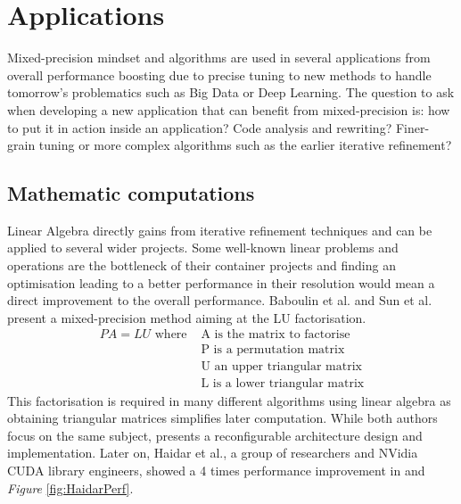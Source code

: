 \section{Applications}

Mixed-precision mindset and algorithms are used in several applications from overall performance boosting due to precise tuning to new methods to handle tomorrow's problematics such as Big Data or Deep Learning. The question to ask when developing a new application that can benefit from mixed-precision is: how to put it in action inside an application? Code analysis and rewriting? Finer-grain tuning or more complex algorithms such as the earlier iterative refinement?


\subsection{Mathematic computations}

Linear Algebra directly gains from iterative refinement techniques and can be applied to several wider projects. Some well-known linear problems and operations are the bottleneck of their container projects and finding an optimisation leading to a better performance in their resolution would mean a direct improvement to the overall performance. Baboulin et al. \cite{Baboulin2009} and Sun et al. \cite{Sun2008} present a mixed-precision method aiming at the LU factorisation.
\begin{align}
  PA=LU \textrm{ where } & \textrm{A is the matrix to factorise} \\
        & \textrm{P is a permutation matrix} \\
        & \textrm{U an upper triangular matrix} \\
        & \textrm{L is a lower triangular matrix}
\end{align}
This factorisation is required in many different algorithms using linear algebra as obtaining triangular matrices simplifies later computation. While both authors focus on the same subject, \cite{Sun2008} presents a reconfigurable architecture design and implementation. Later on, Haidar et al., a group of researchers and NVidia CUDA library engineers, showed a 4 times performance improvement in \cite{Haidar2018} and \emph{Figure} \ref{fig:HaidarPerf}.

